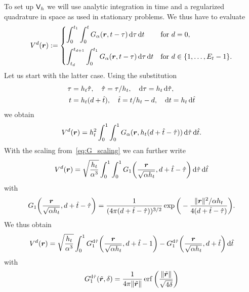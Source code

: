 \documentclass[a4paper,11pt]{article}
\begin{document}
To set up ${{\mathsf{V}}}_h$ we will use analytic integration in time and a regularized quadrature in space as used in stationary problems. We thus have to evaluate
\begin{equation}
\label{eq:V_d}
  V^d({{\bm{r}}}) := 
  \begin{cases}
  \displaystyle
    \int_{0}^{t_1} \int_{0}^{t} G_\alpha({{\bm{r}}},t-\tau) \,{\mathrm{d}}\tau \,{\mathrm{d}} t & \text{for } d = 0, \\[4mm]
  \displaystyle
    \int_{t_d}^{t_{d+1}} \int_{0}^{t_1} G_\alpha({{\bm{r}}},t-\tau) \,{\mathrm{d}}\tau \,{\mathrm{d}} t & \text{for } d \in \{1,\ldots,E_t-1\}.
  \end{cases}
\end{equation}
Let us start with the latter case. Using the substitution
\begin{equation}
\label{eq:subst_tau_t}
\begin{aligned}
  \tau &= h_t \hat\tau, \quad \hat\tau = \tau/h_t, \quad {\mathrm{d}}\tau = h_t\,{\mathrm{d}}\hat\tau, \\
  t &= h_t (d+\hat t), \quad \hat t = t/h_t - d, \quad {\mathrm{d}} t = h_t\,{\mathrm{d}}\hat t
\end{aligned}
\end{equation}
we obtain
\begin{equation*}
  V^d({{\bm{r}}}) = h_t^2 \int_{0}^{1} \int_{0}^{1} G_\alpha({{\bm{r}}},h_t(d+\hat t-\hat\tau)) \,{\mathrm{d}}\hat\tau \,{\mathrm{d}}\hat t.
\end{equation*}
With the scaling from~\eqref{eq:G_scaling} we can further write
\begin{equation*}
  V^d({{\bm{r}}}) = \sqrt{\frac{h_t}{\alpha^3}} \int_{0}^{1} \int_{0}^{1} G_1\bigg(\frac{{{\bm{r}}}}{\sqrt{\alpha h_t}},d+\hat t-\hat\tau\bigg) \,{\mathrm{d}}\hat\tau \,{\mathrm{d}}\hat t
\end{equation*}
with 
\begin{equation*}
  G_1\bigg(\frac{{{\bm{r}}}}{\sqrt{\alpha h_t}},d+\hat t-\hat\tau\bigg) = \frac{1}{(4\pi(d+\hat t-\hat\tau))^{3/2}}\exp\bigg( -\frac{\|{{\bm{r}}}\|^2/\alpha h_t}{4(d+\hat t-\hat\tau)} \bigg).
\end{equation*}
We thus obtain
\begin{equation*}
  V^d({{\bm{r}}}) = \sqrt{\frac{h_t}{\alpha^3}} \int_{0}^{1} G^{{\mathrm{d}} \hat\tau}_1\bigg(\frac{{{\bm{r}}}}{\sqrt{\alpha h_t}},d+\hat t-1\bigg) - G^{{\mathrm{d}} \hat\tau}_1\bigg(\frac{{{\bm{r}}}}{\sqrt{\alpha h_t}},d+\hat t\bigg) \,{\mathrm{d}}\hat t
\end{equation*}
with
\begin{equation}
  \label{eq:G_dtau}
  G^{{\mathrm{d}} \hat\tau}_1(\tilde{{{\bm{r}}}},\delta) = \frac{1}{4\pi \|\tilde {{{\bm{r}}}}\|} \operatorname{erf}\bigg( \frac{\|\tilde {{{\bm{r}}}}\|}{\sqrt{4\delta}} \bigg)
\end{equation}
\end{document}
